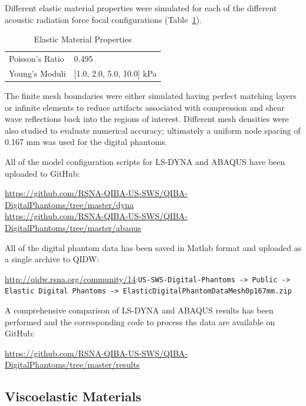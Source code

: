 Different elastic material properties were simulated for each of the different
acoustic radiation force focal configurations (Table~\ref{table:elastic}).

\begin{table}[htb!]
    \centering
    \caption{Elastic Material Properties}
    \begin{tabular}{|l|l|}
    \hline
    Poisson's Ratio & 0.495 \\
    Young's Moduli &  [1.0, 2.0, 5.0, 10.0] kPa \\
    \hline
    \end{tabular}
\label{table:elastic}
\end{table}

The finite mesh boundaries were either simulated having perfect matching layers
or infinite elements to reduce artifacts associated with compression and
shear wave reflections back into the regions of interest.  Different mesh densities were also studied to evaluate numerical accuracy; ultimately a uniform node spacing of 0.167 mm was used for the digital phantoms.

All of the model configuration scripts for LS-DYNA and ABAQUS have been uploaded to GitHub:

\url{https://github.com/RSNA-QIBA-US-SWS/QIBA-DigitalPhantoms/tree/master/dyna}\\
\url{https://github.com/RSNA-QIBA-US-SWS/QIBA-DigitalPhantoms/tree/master/abaqus}

All of the digital phantom data has been saved in Matlab format and uploaded as
a single archive to QIDW:

\url{http://qidw.rsna.org/community/14}:\verb+US-SWS-Digital-Phantoms -> Public ->+\\
\verb+Elastic Digital Phantoms -> ElasticDigitalPhantomDataMesh0p167mm.zip+

A comprehensive comparison of LS-DYNA and ABAQUS results has been performed
and the corresponding code to process the data are available on GitHub:

\url{https://github.com/RSNA-QIBA-US-SWS/QIBA-DigitalPhantoms/tree/master/results}

\subsection{Viscoelastic Materials}

